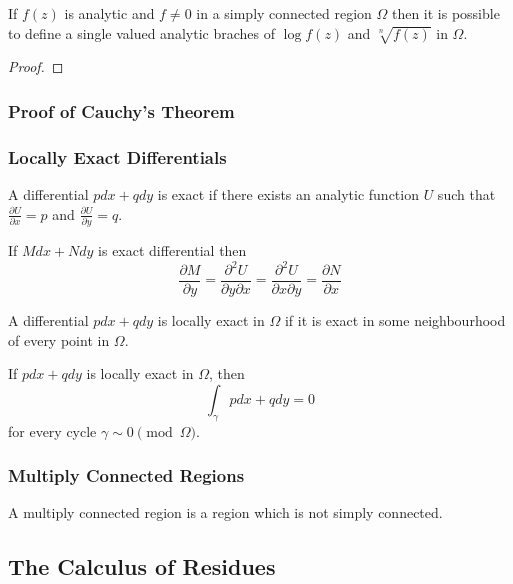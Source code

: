 \begin{corollary}
	If $f(z)$ is analytic and $f \ne 0$ in a simply connected region $\Omega$ then it is possible to define a single valued analytic braches of $\log f(z)$ and $\sqrt[n]{f(z)}$ in $\Omega$.
\end{corollary}
\begin{proof}
\end{proof}

\subsubsection{Proof of Cauchy's Theorem}
\subsubsection{Locally Exact Differentials}
\begin{definition}
	A differential $pdx+qdy$ is exact if there exists an analytic function $U$ such that $\frac{\partial U}{\partial x} = p$ and $\frac{\partial U}{\partial y} = q$.
\end{definition}
\begin{commentary}
\begin{remark}
	If $Mdx+Ndy$ is exact differential then 
	\[ \frac{\partial M}{\partial y} = \frac{\partial^2 U}{\partial y \partial x} = \frac{\partial^2 U}{\partial x \partial y} = \frac{\partial N}{\partial x} \]
\end{remark}
\end{commentary}

\begin{definition}
	A differential $pdx+qdy$ is locally exact in $\Omega$ if it is exact in some neighbourhood of every point in $\Omega$.
\end{definition}
\begin{theorem}
	If $pdx+qdy$ is locally exact in $\Omega$, then
	\[ \int_\gamma pdx+qdy = 0 \]
	for every cycle $\gamma \sim 0 \!\!\! \pmod{\Omega}$.
\end{theorem}
\subsubsection{Multiply Connected Regions}
\begin{definition}
	A multiply connected region is a region which is not simply connected.
\end{definition}

\subsection{The Calculus of Residues}

